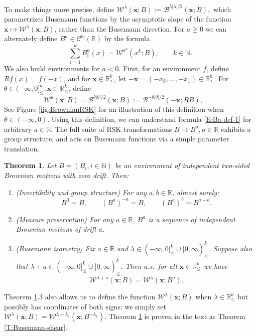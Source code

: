 \documentclass[11pt]{article}
\newcommand{\N}{\mathbb{N}}
\newcommand{\R}{\mathbb{R}}
\newcommand{\la}{\lambda}
\newcommand{\cB}{\mathcal{B}}
\newcommand{\cC}{\mathcal{C}}
\newcommand{\cW}{\mathcal{W}}
\newcommand{\bx}{\mathbf{x}}
\newtheorem{theorem}{Theorem}[section]
\theoremstyle{definition} %
\theoremstyle{remark} %
\begin{document}
 To make things more precise, define
 $
 \cW^\la(\bx; B) := \cB^{\la |\la|/2}(\bx; B),
 $
 which parametrizes Busemann functions by the asymptotic slope of the function $\bx \mapsto \cW^\la(\bx; B)$, rather than the Busemann direction. For $a \ge 0$ we can alternately define $B^a\in \cC^\N(\R)$ by the formula
 \begin{equation}
 	\label{E:Ba-def-1}
 	\sum_{i=1}^k B^a_i(x) = \cW^{a^k}(x^k ; B), \qquad k \in \N.
 \end{equation}
 We also build environments for $a < 0$. First, for an environment $f$, define $Rf(x) = f(-x)$, and for $\bx \in \R^k_\le$, let $-\bx = (-x_k, \dots, -x_1) \in \R^k_\le$. For $\theta \in (-\infty, 0]^k_\le, \bx \in \R^k_\le$, define
 \begin{equation}
 \label{e:reversed-LP}
 \cW^\theta(\bx ; B) = \cB^{\theta|\theta|/2}(\bx ; B) := \cB^{-\theta|\theta|/2}(-\bx ; RB), \qquad       
 \end{equation}
 See Figure \ref{fig:BrownianRSK} for an illustration of this definition when $\theta \in (-\infty, 0)$. Using this definition, we can understand formula \eqref{E:Ba-def-1} for arbitrary $a \in \R$. The full suite of RSK transformations $B \mapsto B^a, a \in \R$  exhibits a group structure, and acts on Busemann functions via a simple parameter translation. 
 \begin{theorem}
 	\label{T:busemann-shear-intro}
 	Let $B = (B_i, i \in \N)$ be an environment of independent two-sided Brownian motions with zero drift.
 	Then:
 	\begin{enumerate}
 		\item (Invertibility and group structure) For any $a, b \in \R$, almost surely:
 		\begin{equation*}
 			B^0 = B, \qquad (B^a)^{-a} = B, \qquad (B^a)^b = B^{a + b}.
 		\end{equation*}
 		\item (Measure preservation) For any $a \in \R$, $B^a$ is a sequence of independent Brownian motions of drift $a$. 
 		\item (Busemann isometry) Fix $a \in \R$ and $\la \in (-\infty, 0]^k_\le \cup [0, \infty)^k_\le$. Suppose also that $\la + a \in (-\infty, 0]^k_\le \cup [0, \infty)^k_\le$. Then a.s.\ for all $\bx \in \R^k_\le$ we have
 		\begin{equation*}
 			\cW^{\la + a}(\bx; B) = \cW^\la(\bx; B^a).
 		\end{equation*}
 	\end{enumerate}
 \end{theorem}
Theorem \ref{T:busemann-shear-intro}.3 also allows us to define the function $\cW^\la(\bx ; B)$ when $\la \in \R^k_\le$ but possibly has coordinates of both signs: we simply set $\cW^\la(\bx ; B) = \cW^{\la - \la_1}(\bx; B^{-\la_1})$. Theorem \ref{T:busemann-shear-intro} is proven in the text as Theorem \ref{T:Busemann-shear}.
 
\end{document}

